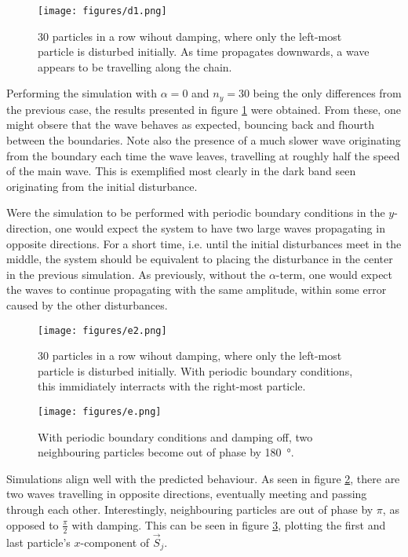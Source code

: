 \begin{figure}
    \centering
    \texttt{[image: figures/d1.png]}
    \caption{
        30 particles in a row wihout damping, where only the left-most particle is disturbed initially.
        As time propagates downwards, a wave appears to be travelling along the chain.
    }
    \label{fig:d1}
\end{figure}

Performing the simulation with $\alpha = 0$ and $n_y = 30$ being the only differences from the previous case, 
the results presented in figure \ref{fig:d1} were obtained. 
From these, one might obsere that the wave behaves as expected, bouncing back and fhourth between the boundaries.
Note also the presence of a much slower wave originating from the boundary each time the wave leaves, 
travelling at roughly half the speed of the main wave. This is
exemplified most clearly in the dark band seen originating from the initial disturbance. 

Were the simulation to be performed with periodic boundary conditions in the $y$-direction, 
one would expect the system to have two large waves propagating in opposite directions. 
For a short time, i.e. until the initial disturbances meet in the middle, 
the system should be equivalent to placing the disturbance in the center in the previous simulation.
As previously, without the $\alpha$-term, one would expect the waves to continue propagating with the same amplitude,
within some error caused by the other disturbances.

\begin{figure}
    \centering
    \texttt{[image: figures/e2.png]}
    \caption{
        30 particles in a row wihout damping, where only the left-most particle is disturbed initially.
        With periodic boundary conditions, this immidiately interracts with the right-most particle.
    }
    \label{fig:e1}
\end{figure}

\begin{figure}
    \centering
    \texttt{[image: figures/e.png]}
    \caption{
        With periodic boundary conditions and damping off, 
        two neighbouring particles become out of phase by \SI{180}{\degree}.
    }
    \label{fig:e2}
\end{figure}

Simulations align well with the predicted behaviour. 
As seen in figure \ref{fig:e1}, there are two waves travelling in opposite directions, 
eventually meeting and passing through each other. 
Interestingly, neighbouring particles are out of phase by $\pi$, as opposed to $\frac{\pi}{2}$ with damping.
This can be seen in figure \ref{fig:e2}, plotting the first and last particle's $x$-component of $\vec{S}_j$.

